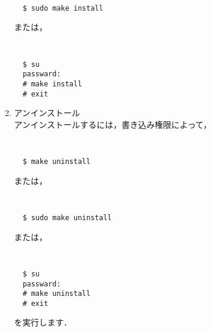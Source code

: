 \begin{enumerate}
{\tt
\begin{verbatim}
  $ sudo make install
\end{verbatim}
}
または，
{\tt
\begin{verbatim}
  $ su 
  passward:
  # make install
  # exit
\end{verbatim}
}
\clearpage


\item アンインストール\\
アンインストールするには，書き込み権限によって，
{\tt
\begin{verbatim}
  $ make uninstall
\end{verbatim}
}
または，
{\tt
\begin{verbatim}
  $ sudo make uninstall
\end{verbatim}
}
または，
{\tt
\begin{verbatim}
  $ su 
  passward:
  # make uninstall
  # exit
\end{verbatim}
}
を実行します．

\end{enumerate}
\clearpage


